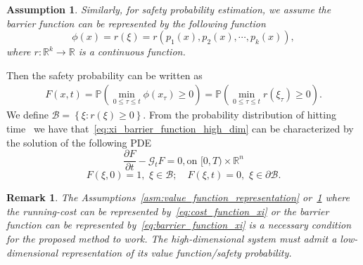 \documentclass[letterpaper]{article} %
\newcommand{\jacob}[1]{\textcolor{blue}{[Jacob: #1]}}
\newcommand{\pr}{\mathbb{P}}
\newtheorem{remark}[theorem]{Remark}
\newtheorem{assumption}[theorem]{Assumption}
\begin{document}
\begin{assumption}
\label{asm:barrier_function_representation}
Similarly, for safety probability estimation, we assume the barrier function can be represented by the following function
\begin{equation}
\label{eq:barrier_function_xi}
    \phi(x) = r(\xi) = r\left(p_1(x), p_2(x), \cdots, p_k(x)\right),
\end{equation}
where $r:\mathbb{R}^{k} \rightarrow \mathbb{R}$ is a continuous function.
\end{assumption}
Then the safety probability can be written as
\begin{equation}
\label{eq:xi_barrier_function_high_dim}
\begin{aligned}
    F(x,t) = \pr\left(\min_{0\leq \tau \leq t} \phi(x_\tau) \geq 0\right)  = \pr\left(\min_{0\leq \tau \leq t} r(\xi_\tau) \geq 0\right).
\end{aligned}
\end{equation}
We define $\mathcal{B} = \left\{\xi: r(\xi) \geq 0\right\}$. From the probability distribution of hitting time~\cite{patie2008first} we have that~\eqref{eq:xi_barrier_function_high_dim} can be characterized by the solution of the following PDE
\begin{equation}
    \frac{\partial F}{\partial t}-\mathcal{G}_t F =0,  \text {on }[0, T) \times \mathbb{R}^n
\end{equation}
\begin{equation}
   F(\xi,0)  =1, \,\, \xi\in\mathcal{B}; \quad F(\xi,t)  =0, \,\, \xi \in \partial \mathcal{B}.
\end{equation}





\begin{remark}
\label{rmk:low_dim_representation}
    The Assumptions~\ref{asm:value_function_representation} or~\ref{asm:barrier_function_representation} where the running-cost can be represented by~\eqref{eq:cost_function_xi} or the barrier function can be represented by~\eqref{eq:barrier_function_xi} is a necessary condition for the proposed method to work. The high-dimensional system must admit a low-dimensional representation of its value function/safety probability.
\end{remark}

\vspace{-0.4em}
\end{document}

